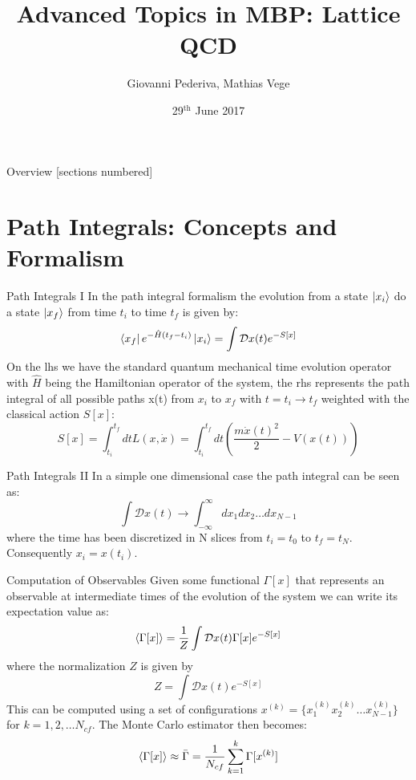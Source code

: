 \documentclass[10pt]{beamer}
\title{Advanced Topics in MBP: Lattice QCD}
\date{29$^\text{th}$ June 2017}
\author{Giovanni Pederiva, Mathias Vege}
\institute{University of Oslo}
\newcommand{\D}{\mathcal{D}}
\begin{document}
\maketitle

\begin{frame}{Overview}
  [sections numbered]
  \tableofcontents[hideallsubsections]
\end{frame}

\section{Path Integrals: Concepts and Formalism}
\begin{frame}{Path Integrals I}
In the path integral formalism the evolution from a state $\ket{x_i}$ do a state $\ket{x_f}$ from time $t_i$ to time $t_f$ is given by:
\[
	\bra{x_f}e^{-\hat{H}(t_f-t_i)}\ket{x_i} = \int \D x(t) e^{-S[x]}
\]
On the lhs we have the standard quantum mechanical time evolution operator with $\hat{H}$ being the Hamiltonian operator of the system, the rhs represents the path integral of all possible paths x(t) from $x_i$ to $x_f$ with $t = t_i \rightarrow t_f$ weighted with the classical action $S[x]$:
\[
	S[x] = \int_{t_i}^{t_f} dt L(x,\dot{x}) =  \int_{t_i}^{t_f} dt \left( \frac{m\dot{x}(t)^2}{2} - V(x(t))\right)
\]
\end{frame}

\begin{frame}{Path Integrals II}
In a simple one dimensional case the path integral can be seen as:
\[
	 \int \D x(t) \rightarrow \int_{-\infty}^{\infty} dx_1dx_2\dots dx_{N-1}
\]
where the time has been discretized in N slices from $t_i = t_0$ to $t_f = t_N$. Consequently $x_i = x(t_i)$.  
\end{frame}

\begin{frame}{Computation of Observables}
Given some functional $\Gamma[x]$ that represents an observable at intermediate times of the evolution of the system we can write its expectation value as:
\[
	\braket{\Gamma[x]} = \frac{1}{Z} \int \D x(t) \Gamma[x] e^{-S[x]}
\]
where the normalization $Z$ is given by 
\[
	Z = \int \D x(t) e^{-S[x]}
\]
This can be computed using a set of configurations $x^{(k)} = \{x^{(k)}_1x^{(k)}_2\dots x^{(k)}_{N-1} \}$ for $k = 1,2,\dots N_{cf}$. The Monte Carlo estimator then becomes:
\[
	\braket{\Gamma[x]} \approx \bar{\Gamma} = \frac{1}{N_{cf}} \sum_{k = 1}^k \Gamma[x^{(k)}]
\]
\end{frame}
\end{document}
